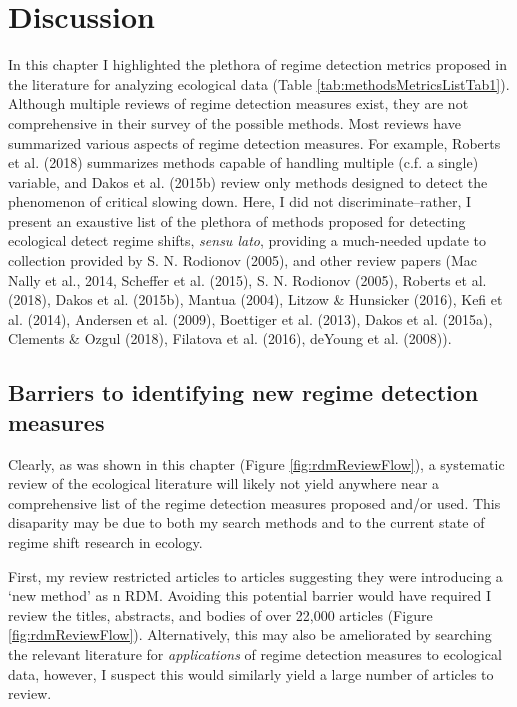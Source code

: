 \documentclass[12pt,twoside,openany]{reedthesis}
\begin{document}
\section{Discussion}\label{discussion}

In this chapter I highlighted the plethora of regime detection metrics
proposed in the literature for analyzing ecological data (Table
\ref{tab:methodsMetricsListTab1}). Although multiple reviews of regime
detection measures exist, they are not comprehensive in their survey of
the possible methods. Most reviews have summarized various aspects of
regime detection measures. For example, Roberts et al. (2018) summarizes
methods capable of handling multiple (c.f. a single) variable, and Dakos
et al. (2015b) review only methods designed to detect the phenomenon of
critical slowing down. Here, I did not discriminate--rather, I present
an exaustive list of the plethora of methods proposed for detecting
ecological detect regime shifts, \emph{sensu lato}, providing a
much-needed update to collection provided by S. N. Rodionov (2005), and
other review papers (Mac Nally et al., 2014, Scheffer et al. (2015), S.
N. Rodionov (2005), Roberts et al. (2018), Dakos et al. (2015b), Mantua
(2004), Litzow \& Hunsicker (2016), Kefi et al. (2014), Andersen et al.
(2009), Boettiger et al. (2013), Dakos et al. (2015a), Clements \& Ozgul
(2018), Filatova et al. (2016), deYoung et al. (2008)).

\subsection{Barriers to identifying new regime detection
measures}\label{barriers-to-identifying-new-regime-detection-measures}

Clearly, as was shown in this chapter (Figure \ref{fig:rdmReviewFlow}),
a systematic review of the ecological literature will likely not yield
anywhere near a comprehensive list of the regime detection measures
proposed and/or used. This disaparity may be due to both my search
methods and to the current state of regime shift research in ecology.

First, my review restricted articles to articles suggesting they were
introducing a `new method' as n RDM. Avoiding this potential barrier
would have required I review the titles, abstracts, and bodies of over
22,000 articles (Figure \ref{fig:rdmReviewFlow}). Alternatively, this
may also be ameliorated by searching the relevant literature for
\emph{applications} of regime detection measures to ecological data,
however, I suspect this would similarly yield a large number of articles
to review.
\end{document}
